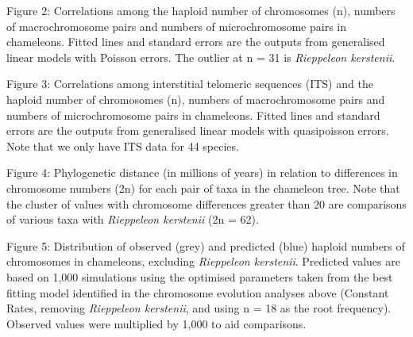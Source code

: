 \documentclass[a4paper, 12pt]{article}
\begin{document}
Figure 2: Correlations among the haploid number of chromosomes (n), numbers of macrochromosome pairs and numbers of microchromosome pairs in chameleons. Fitted lines and standard errors are the outputs from generalised linear models with Poisson errors. The outlier at n = 31 is \textit{Rieppeleon kerstenii}.

Figure 3: Correlations among interstitial telomeric sequences (ITS) and the haploid number of chromosomes (n), numbers of macrochromosome pairs and numbers of microchromosome pairs in chameleons. Fitted lines and standard errors are the outputs from generalised linear models with quasipoisson errors. Note that we only have ITS data for 44 species.

Figure 4: Phylogenetic distance (in millions of years) in relation to differences in chromosome numbers (2n) for each pair of taxa in the chameleon tree. Note that the cluster of values with chromosome differences greater than 20 are comparisons of various taxa with \textit{Rieppeleon kerstenii} (2n = 62).

Figure 5: Distribution of observed (grey) and predicted (blue) haploid numbers of chromosomes in chameleons, excluding \textit{Rieppeleon kerstenii}. Predicted values are based on 1,000 simulations using the optimised parameters taken from the best fitting model identified in the chromosome evolution analyses above (Constant Rates, removing \textit{Rieppeleon kerstenii}, and using n = 18 as the root frequency). Observed values were multiplied by 1,000 to aid comparisons.
\end{document}

